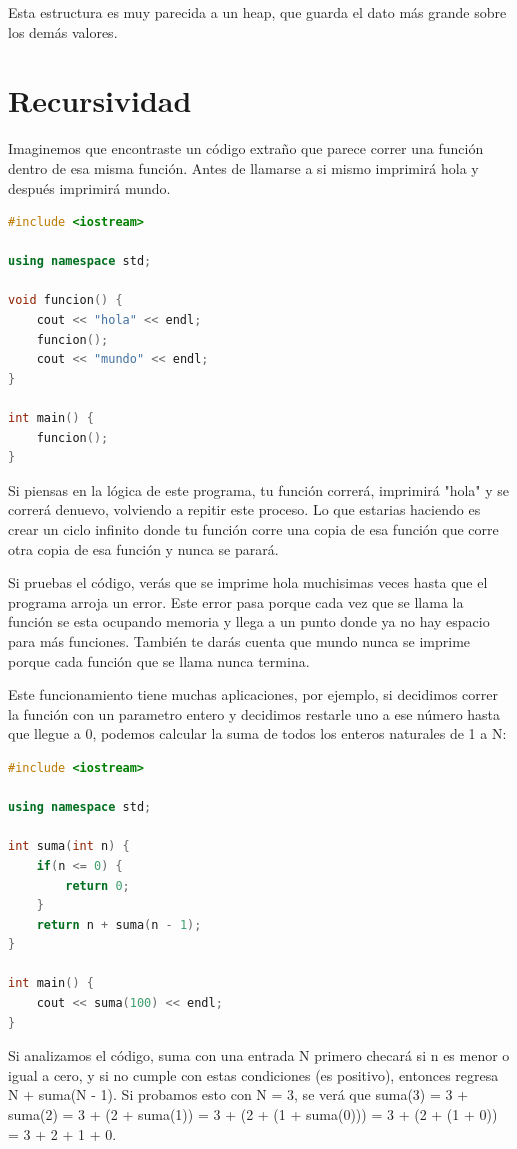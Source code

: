 \documentclass{article}
\begin{document}
Esta estructura es muy parecida a un heap, que guarda el dato más grande sobre los demás valores.

\section{Recursividad}

Imaginemos que encontraste un código extraño que parece correr una función dentro de esa misma función. Antes de llamarse a si mismo imprimirá hola y después imprimirá mundo.

\begin{lstlisting}[language=C++, title=Funciones]
#include <iostream>

using namespace std;

void funcion() {
	cout << "hola" << endl;
	funcion();
	cout << "mundo" << endl;
}

int main() {
	funcion();
}
\end{lstlisting}

Si piensas en la lógica de este programa, tu función correrá, imprimirá "hola" y se correrá denuevo, volviendo a repitir este proceso. Lo que estarias haciendo es crear un ciclo infinito donde tu función corre una copia de esa función que corre otra copia de esa función y nunca se parará.

Si pruebas el código, verás que se imprime hola muchisimas veces hasta que el programa arroja un error. Este error pasa porque cada vez que se llama la función se esta ocupando memoria y llega a un punto donde ya no hay espacio para más funciones. También te darás cuenta que mundo nunca se imprime porque cada función que se llama nunca termina.

Este funcionamiento tiene muchas aplicaciones, por ejemplo, si decidimos correr la función con un parametro entero y decidimos restarle uno a ese número hasta que llegue a 0, podemos calcular la suma de todos los enteros naturales de 1 a N:

\begin{lstlisting}[language=C++, title=Suma de enteros]
#include <iostream>

using namespace std;

int suma(int n) {
	if(n <= 0) {
		return 0;
	}
	return n + suma(n - 1);
}

int main() {
	cout << suma(100) << endl;
}
\end{lstlisting}

Si analizamos el código, suma con una entrada N primero checará si n es menor o igual a cero, y si no cumple con estas condiciones (es positivo), entonces regresa N + suma(N - 1). Si probamos esto con N = 3, se verá que suma(3) = 3 + suma(2) = 3 + (2 + suma(1)) = 3 + (2 + (1 + suma(0))) = 3 + (2 + (1 + 0)) = 3 + 2 + 1 + 0.
\end{document}
